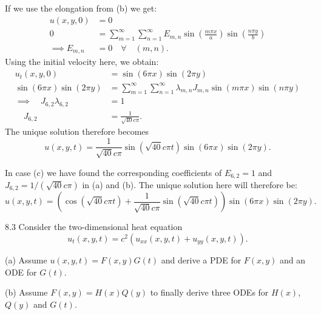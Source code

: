 \begin{derivation}
  If we use the elongation from (b) we get:
  \begin{align*}
    u(x,y,0) &= 0 \\
    0 &= \sum_{m = 1}^{\infty} \sum_{n = 1}^{\infty} E_{m,n} \sin \left( \frac{m \pi x}{a} \right) \sin \left( \frac{n \pi y}{b} \right) \\
    \implies E_{m,n} &= 0 \quad \forall \quad (m,n)
  .\end{align*}
  Using the initial velocity here, we obtain:
  \begin{align*}
    u_t(x,y,0) &= \sin \left( 6 \pi x \right) \sin \left( 2 \pi y \right) \\
    \sin (6 \pi x) \sin \left( 2 \pi y \right) &= \sum_{m = 1}^{\infty} \sum_{n = 1}^{\infty} \lambda_{m,n} J_{m,n} \sin \left( m\pi x \right) \sin (n \pi y) \\
    \implies \quad J_{6,2} \lambda_{6,2} &= 1 \\
    \quad J_{6,2} &= \frac{1}{\sqrt{40}c\pi}
  .\end{align*}
  The unique solution therefore becomes
  \[ 
  u(x,y,t) = \frac{1}{\sqrt{40}c \pi} \sin \left( \sqrt{40}c\pi t \right) \sin \left( 6 \pi x \right) \sin \left( 2 \pi y \right)
  .\]
  
  In case (c) we have found the corresponding coefficients of $E_{6,2} = 1$ and $J_{6,2} = 1 / (\sqrt{40}c \pi)$ in (a) and (b).
  The unique solution here will therefore be:
  \[ 
  u(x,y,t) = \left( \cos \left( \sqrt{40}c\pi t \right) + \frac{1}{\sqrt{40}c\pi} \sin \left( \sqrt{40}c\pi t \right) \right) \sin \left( 6 \pi x \right) \sin \left( 2 \pi y \right)
  .\]
\end{derivation}


\begin{problem}{8.3}
  Consider the two-dimensional heat equation
  \[ 
  u_t(x,y,t) = c^2 (u_{x x}(x,y,t) + u_{yy}(x,y,t))
  .\]
  
  (a) Assume $u(x,y,t) = F(x,y)G(t)$ and derive a PDE for $F(x,y)$ and an ODE for $G(t)$.

  (b) Assume $F(x,y) = H(x) Q(y)$ to finally derive three ODEs for $H(x)$, $Q(y)$ and $G(t)$.
\end{problem}

